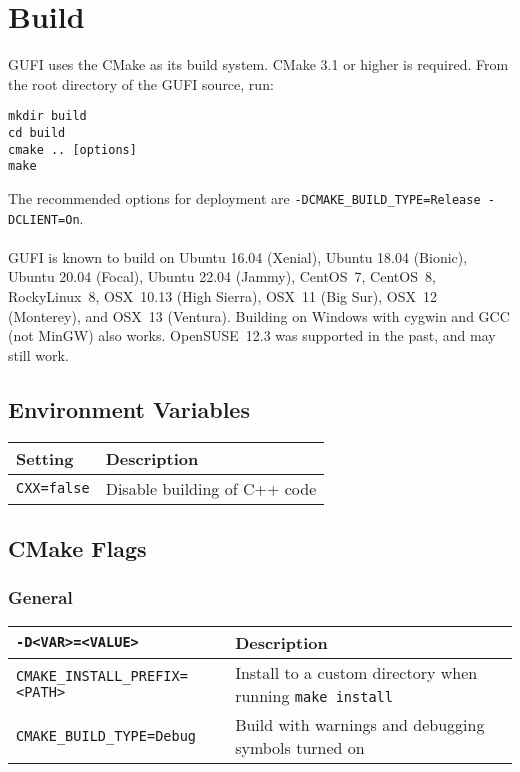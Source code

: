 \section{Build}

GUFI uses the CMake as its build system. CMake 3.1 or higher is
required. From the root directory of the GUFI source, run:
\begin{verbatim}
mkdir build
cd build
cmake .. [options]
make
\end{verbatim}

The recommended options for deployment are
\texttt{-DCMAKE\_BUILD\_TYPE=Release -DCLIENT=On}.
\\\\
GUFI is known to build on Ubuntu 16.04 (Xenial), Ubuntu 18.04
(Bionic), Ubuntu 20.04 (Focal), Ubuntu 22.04 (Jammy), CentOS~7,
CentOS~8, RockyLinux~8, OSX~10.13 (High Sierra), OSX~11 (Big Sur),
OSX~12 (Monterey), and OSX~13 (Ventura). Building on Windows with
cygwin and GCC (not MinGW) also works. OpenSUSE~12.3 was supported in
the past, and may still work.

\subsection{Environment Variables}
\begin{table}[h]
\centering
\begin{tabularx}{1.2\textwidth}{| l | X |}
  \hline
  Setting & Description \\
  \hline
  \texttt{CXX=false} & Disable building of C++ code \\
  \hline
\end{tabularx}
\end{table}

\subsection{CMake Flags}

\subsubsection{General}
\begin{table}[h!]
\centering
\begin{tabularx}{1.2\textwidth}{| l | X |}
  \hline
  \texttt{-D<VAR>=<VALUE>} & Description \\
  \hline
  \texttt{CMAKE\_INSTALL\_PREFIX=<PATH>}
  & Install to a custom directory when running \texttt{make install} \\
  \hline
  \texttt{CMAKE\_BUILD\_TYPE=Debug}
  & Build with warnings and debugging symbols turned on \\
  \hline
\end{tabularx}
\end{table}

